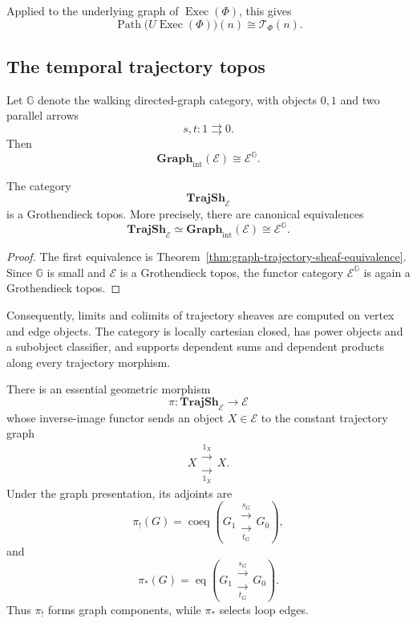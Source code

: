 Applied to the underlying graph of \(\operatorname{Exec}(\Phi)\), this
gives
\[
    \operatorname{Path}
    \bigl(
        U\operatorname{Exec}(\Phi)
    \bigr)(n)
    \cong
    \mathscr T_\Phi(n).
\]

\subsection{The temporal trajectory topos}
\label{subsec:temporal-trajectory-topos}

Let \(\mathbb G\) denote the walking directed-graph category, with objects
\(0,1\) and two parallel arrows
\[
    s,t:1\rightrightarrows0.
\]
Then
\[
    \mathbf{Graph}_{\mathrm{int}}(\mathcal E)
    \cong
    \mathcal E^{\mathbb G}.
\]

\begin{theorem}
\label{thm:temporal-trajectory-topos}
The category
\[
    \mathbf{TrajSh}_{\mathcal E}
\]
is a Grothendieck topos. More precisely, there are canonical equivalences
\[
    \mathbf{TrajSh}_{\mathcal E}
    \simeq
    \mathbf{Graph}_{\mathrm{int}}(\mathcal E)
    \cong
    \mathcal E^{\mathbb G}.
\]
\end{theorem}

\begin{proof}
The first equivalence is
Theorem~\ref{thm:graph-trajectory-sheaf-equivalence}. Since \(\mathbb G\)
is small and \(\mathcal E\) is a Grothendieck topos, the functor category
\(\mathcal E^{\mathbb G}\) is again a Grothendieck topos.
\end{proof}

Consequently, limits and colimits of trajectory sheaves are computed on
vertex and edge objects. The category is locally cartesian closed, has power
objects and a subobject classifier, and supports dependent sums and dependent
products along every trajectory morphism.

There is an essential geometric morphism
\[
    \pi:
    \mathbf{TrajSh}_{\mathcal E}
    \longrightarrow
    \mathcal E
\]
whose inverse-image functor sends an object \(X\in\mathcal E\) to the
constant trajectory graph
\[
    X
    \mathrel{\substack{\xrightarrow{1_X}\\[-0.4em]\xrightarrow[1_X]{}}}
    X.
\]
Under the graph presentation, its adjoints are
\[
    \pi_!(G)
    =
    \operatorname{coeq}
    \left(
        G_1
        \mathrel{\substack{\xrightarrow{s_G}\\[-0.4em]\xrightarrow[t_G]{}}}
        G_0
    \right),
\]
and
\[
    \pi_*(G)
    =
    \operatorname{eq}
    \left(
        G_1
        \mathrel{\substack{\xrightarrow{s_G}\\[-0.4em]\xrightarrow[t_G]{}}}
        G_0
    \right).
\]
Thus \(\pi_!\) forms graph components, while \(\pi_*\) selects loop edges.

